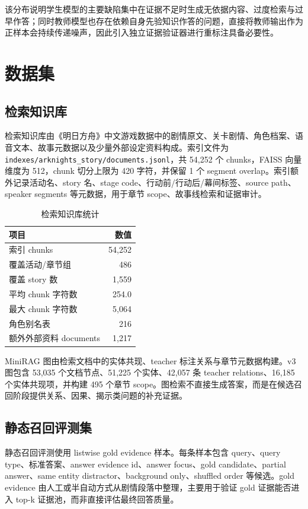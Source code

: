 \documentclass[UTF8,a4paper,12pt]{ctexart}
\newcommand{\code}[1]{\texttt{#1}}
\begin{document}
该分布说明学生模型的主要缺陷集中在证据不足时生成无依据内容、过度检索与过早作答；同时教师模型也存在依赖自身先验知识作答的问题，直接将教师输出作为正样本会持续传递噪声，因此引入独立证据验证器进行重标注具备必要性。

\section{数据集}

\subsection{检索知识库}

检索知识库由《明日方舟》中文游戏数据中的剧情原文、关卡剧情、角色档案、语音文本、故事元数据以及少量外部设定资料构成。索引文件为 \code{indexes/arknights\_story/documents.jsonl}，共 54,252 个 chunks，FAISS 向量维度为 512，chunk 切分上限为 420 字符，并保留 1 个 segment overlap。索引额外记录活动名、story 名、stage code、行动前/行动后/幕间标签、source path、speaker segments 等元数据，用于章节 scope、故事线检索和证据审计。

\begin{table}[htbp]
\centering
\small
\begin{tabular}{lr}
\toprule
项目 & 数值 \\
\midrule
索引 chunks & 54,252 \\
覆盖活动/章节组 & 486 \\
覆盖 story 数 & 1,559 \\
平均 chunk 字符数 & 254.0 \\
最大 chunk 字符数 & 5,064 \\
角色别名表 & 216 \\
额外外部资料 documents & 1,217 \\
\bottomrule
\end{tabular}
\caption{检索知识库统计}
\end{table}

MiniRAG 图由检索文档中的实体共现、teacher 标注关系与章节元数据构建。v3 图包含 53,035 个文档节点、51,225 个实体、42,057 条 teacher relations、16,185 个实体共现项，并构建 495 个章节 scope。图检索不直接生成答案，而是在候选召回阶段提供关系、因果、揭示类问题的补充证据。

\subsection{静态召回评测集}

静态召回评测使用 listwise gold evidence 样本。每条样本包含 query、query type、标准答案、answer evidence id、answer focus、gold candidate、partial answer、same entity distractor、background only、shuffled order 等候选。gold evidence 由人工或半自动方式从剧情段落中整理，主要用于验证 gold 证据能否进入 top-k 证据池，而非直接评估最终回答质量。
\end{document}
